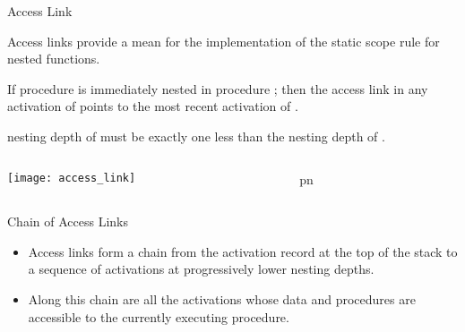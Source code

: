\begin{bibunit}[apalike]
\begin{frame}{Access Link}
	\begin{small}
	\begin{definition}
		Access links provide a mean for the implementation of the static scope rule for nested functions.
	\end{definition}
	\begin{description}
	\item If procedure  is immediately nested in procedure ; then the access link in any activation of  points to the most recent activation of .
	\item[Note] nesting depth of  must be exactly one less than the nesting depth of .
	\end{description}
	\end{small}
	\begin{columns}
		\begin{column}{.5\linewidth}
			\texttt{[image: access\_link]}
		\end{column}
		\begin{column}{.3\linewidth}
			\begin{tiny}
			\begin{myprocedure}{p}{n}
			\end{myprocedure}
			\end{tiny}
		\end{column}
	\end{columns}
\end{frame}

\begin{frame}{Chain of Access Links}
	\begin{itemize}
	\item Access links form a chain from the activation record at the top of the stack to a sequence of activations at progressively lower nesting depths.
	\vfill
	\item Along this chain are all the activations whose data and procedures are accessible to the currently executing procedure.
	\end{itemize}
\end{frame}


\end{bibunit}
